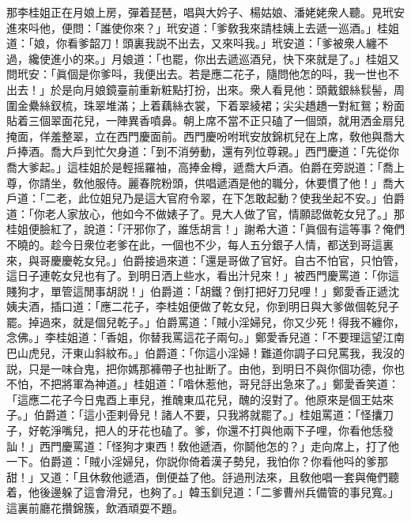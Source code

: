 那李桂姐正在月娘上房，彈着琵琶，唱與大妗子、楊姑娘、潘姥姥衆人聽。見玳安進來呌他，便問：「誰使你來？」玳安道：「爹敎我來請桂姨上去遞一巡酒。」桂姐道：「娘，你看爹韶刀！頭裏我説不出去，又來呌我。」玳安道：「爹被衆人纏不過，纔使進小的來。」月娘道：「也罷，你出去遞巡酒兒，快下來就是了。」桂姐又問玳安：「眞個是你爹呌，我便出去。若是應二花子，隨問他怎的呌，我一世也不出去！」於是向月娘鏡臺前重新粧點打扮，出來。衆人看見他：頭戴銀絲䯼髻，周圍金纍絲釵梳，珠翠堆滿；上着藕絲衣裳，下着翠綾裙；尖尖趫趫一對紅鴛；粉面貼着三個翠面花兒，一陣異香噴鼻。朝上席不當不正只磕了一個頭，就用洒金扇兒掩面，佯羞整翠，立在西門慶面前。西門慶吩咐玳安放錦杌兒在上席，敎他與喬大戶捧酒。喬大戶到忙欠身道：「到不消勞動，還有列位尊親。」西門慶道：「先從你喬大爹起。」這桂姐於是輕摇羅袖，高捧金樽，遞喬大戶酒。伯爵在旁説道：「喬上尊，你請坐，敎他服侍。麗春院粉頭，供唱遞酒是他的職分，休要慣了他！」喬大戶道：「二老，此位姐兒乃是這大官府令翠，在下怎敢起動？使我坐起不安。」伯爵道：「你老人家放心，他如今不做婊子了。見大人做了官，情願認做乾女兒了。」那桂姐便臉紅了，說道：「汗邪你了，誰恁胡言！」謝希大道：「眞個有這等事？俺們不曉的。趁今日衆位老爹在此，一個也不少，每人五分銀子人情，都送到哥這裏來，與哥慶慶乾女兒。」伯爵接過來道：「還是哥做了官好。自古不怕官，只怕管，這日子連乾女兒也有了。到明日洒上些水，看出汁兒來！」被西門慶罵道：「你這賤狗才，單管這閒事胡説！」伯爵道：「胡鐵？倒打把好刀兒哩！」鄭愛香正遞沈姨夫酒，插口道：「應二花子，李桂姐便做了乾女兒，你到明日與大爹做個乾兒子罷。掉過來，就是個兒乾子。」伯爵罵道：「賊小淫婦兒，你又少死！得我不纏你，念佛。」李桂姐道：「香姐，你替我罵這花子兩句。」鄭愛香兒道：「不要理這望江南巴山虎兒，汗東山斜紋布。」伯爵道：「你這小淫婦！難道你調子曰兒罵我，我沒的説，只是一味㒲鬼，把你媽那褲帶子也扯断了。由他，到明日不與你個功德，你也不怕，不把將軍為神道。」桂姐道：「喒休惹他，哥兒㧱出急來了。」鄭愛香笑道：「這應二花子今日鬼酉上車兒，推醜東瓜花兒，醜的沒對了。他原來是個王姑來子。」伯爵道：「這小歪剌骨兒！諸人不要，只我將就罷了。」桂姐罵道：「怪攮刀子，好乾淨嘴兒，把人的牙花也磕了。爹，你還不打與他兩下子哩，你看他恁發訕！」西門慶罵道：「怪狗才東西！敎他遞酒，你鬬他怎的？」走向席上，打了他一下。伯爵道：「賊小淫婦兒，你説你倚着漢子勢兒，我怕你？你看他呌的爹那甜！」又道：「且休敎他遞酒，倒便益了他。㧱過刑法來，且敎他唱一套與俺們聽着，他後邊躲了這會滑兒，也夠了。」韓玉釧兒道：「二爹曹州兵備管的事兒寬。」這裏前廳花攢錦簇，飲酒頑耍不題。

